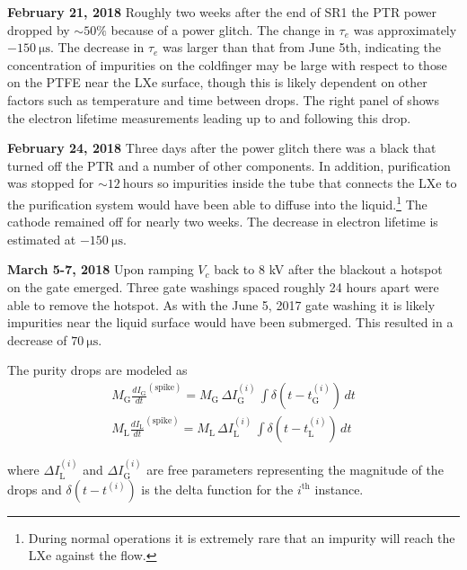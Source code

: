 \textbf{February 21, 2018}  Roughly two weeks after the end of SR1 the PTR power dropped by ${\sim} 50\%$ because of a power glitch.  The
change in $\tau_e$ was approximately $-150\ \mathrm{\mu s}$.  The decrease in $\tau_e$ was larger than that from June 5th, indicating the
concentration of impurities on the
coldfinger may be large with respect to those on the PTFE near the LXe surface, though this is likely dependent on other factors such as
temperature and time between drops.  The right panel of  shows the
electron lifetime measurements leading up to and following this drop.

\textbf{February 24, 2018}  Three days after the power glitch there was a black that turned off the PTR and a number of other
components.  In addition, purification was stopped for ${\sim}12\ \mathrm{hours}$ so impurities inside the tube that connects the LXe to the
purification system would have been able to diffuse into the liquid.\footnote{During normal operations it is extremely rare that an
impurity will reach the LXe against the flow.}  The cathode remained off for nearly two weeks.  The decrease in electron lifetime is
estimated at $-150\ \mathrm{\mu s}$.

\textbf{March 5-7, 2018}  Upon ramping $V_c$ back to 8 kV after the blackout a hotspot on the gate emerged.  Three gate washings spaced
roughly 24 hours apart were able to remove the hotspot.  As with the June 5, 2017 gate washing it is likely impurities near the liquid
surface would have been submerged.  This resulted in a decrease of $70\ \mathrm{\mu s}$.

The purity drops are modeled as
\vspace{-10pt}
\begin{subequations}
\begin{align}
M_{\mathrm{G}} \frac{dI_{\mathrm{G}}}{dt}^{(\mathrm{spike})} = M_{\mathrm{G}}\, \Delta I_{\mathrm{G}}^{(i)}\,
\int \delta (t - t_{\mathrm{G}}^{(i)})\, dt
\\
M_{\mathrm{L}}\frac{dI_{\mathrm{L}}}{dt}^{(\mathrm{spike})} = M_{\mathrm{L}}\, \Delta I_{\mathrm{L}}^{(i)}\,
\int \delta (t - t_{\mathrm{L}}^{(i)})\, dt
\end{align}
\end{subequations}

\vspace{-10pt}

\noindent where $\Delta I_{\mathrm{L}}^{(i)}$ and $\Delta I_{\mathrm{G}}^{(i)}$ are free parameters representing the magnitude of the
drops and $\delta (t - t^{(i)})$ is the delta function for the $i^{\mathrm{th}}$ instance.

